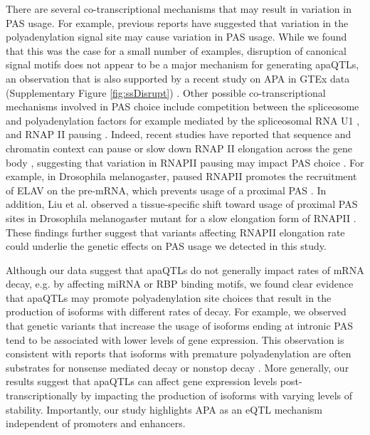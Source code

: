 There are several co-transcriptional mechanisms that may result in variation in PAS usage. For example, previous reports have suggested that variation in the polyadenylation signal site may cause variation in PAS usage. While we found that this was the case for a small number of examples, disruption of canonical signal motifs does not appear to be a major mechanism for generating apaQTLs, an observation that is also supported by a recent study on APA in GTEx data (Supplementary Figure \ref{fig:ssDisrupt}) \citep{li_genetic_2019}. Other possible co-transcriptional mechanisms involved in PAS choice include competition between the spliceosome and polyadenylation factors for example mediated by the spliceosomal RNA U1 \citep{oh_u1_2017}, and RNAP II pausing \citep{fusby_coordination_2016}. Indeed, recent studies have reported that sequence and chromatin context can pause or slow down RNAP II elongation across the gene body \citep{mayer_native_2015}, suggesting that variation in RNAPII pausing may impact PAS choice \citep{fusby_coordination_2016}. For example, in Drosophila melanogaster, paused RNAPII promotes the recruitment of ELAV on the pre-mRNA, which prevents usage of a proximal PAS \citep{oktaba_elav_2015}. In addition, Liu et al. observed a tissue-specific shift toward usage of proximal PAS sites in Drosophila melanogaster mutant for a slow elongation form of RNAPII \citep{liu_transcription_2017}. These findings further suggest that variants affecting RNAPII elongation rate could underlie the genetic effects on PAS usage we detected in this study. 

Although our data suggest that apaQTLs do not generally impact rates of mRNA decay, e.g. by affecting miRNA or RBP binding motifs, we found clear evidence that apaQTLs may promote polyadenylation site choices that result in the production of isoforms with different rates of decay. For example, we observed that genetic variants that increase the usage of isoforms ending at intronic PAS tend to be associated with lower levels of gene expression. This observation is consistent with reports that isoforms with premature polyadenylation are often substrates for nonsense mediated decay or nonstop decay \citep{tian_alternative_2017, vasudevan_non-stop_2002}. More generally, our results suggest that apaQTLs can affect gene expression levels post-transcriptionally by impacting the production of isoforms with varying levels of stability. Importantly, our study highlights APA as an eQTL mechanism independent of promoters and enhancers. 


